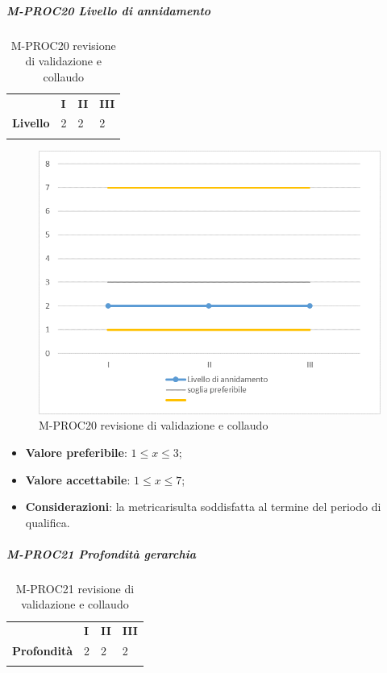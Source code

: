 \subparagraph{M-PROC20 Livello di annidamento} \mbox{}
\begin{longtable}[H!] {						
		>{}p{50mm}  		
		>{}p{8mm}
		>{}p{8mm}		
		>{}p{8mm}		
	}
	\rowcolor{gray!50}
	\textbf{} & \textbf{I} & \textbf{II} & \textbf{III} \TBstrut \\ [2mm]
	\textbf{Livello} & 2 & 2 & 2 \TBstrut \\ [2mm]
	\rowcolor{white}
	\caption{M-PROC20 revisione di validazione e collaudo}
\end{longtable}
\begin{figure}[H] 	
	\includegraphics[width=\linewidth]{./img/grafici/RA20.png}	
	\caption{M-PROC20 revisione di validazione e collaudo}	
\end{figure}
\begin{itemize}
	\item \textbf{Valore preferibile}: $1\le x \le 3$;
	\item \textbf{Valore accettabile}: $1 \le x \le 7$;
	\item \textbf{Considerazioni}: la metrica\glosp risulta soddisfatta al termine del periodo di qualifica.
\end{itemize}
\subparagraph{M-PROC21 Profondità gerarchia} \mbox{}
\begin{longtable}[H!] {						
		>{}p{50mm}  		
		>{}p{8mm}
		>{}p{8mm}		
		>{}p{8mm}		
	}
	\rowcolor{gray!50}
	\textbf{} & \textbf{I} & \textbf{II} & \textbf{III} \TBstrut \\ [2mm]
	\textbf{Profondità} & 2 & 2 & 2 \TBstrut \\ [2mm]
	\rowcolor{white}
	\caption{M-PROC21 revisione di validazione e collaudo}
\end{longtable}
